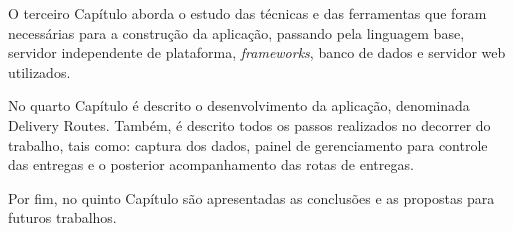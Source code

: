 O terceiro Capítulo aborda o estudo das técnicas e das ferramentas que foram necessárias para a construção da aplicação, passando pela linguagem base, servidor independente de plataforma, \textit{frameworks}, banco de dados e servidor web utilizados.

No quarto Capítulo é descrito o desenvolvimento da aplicação, denominada Delivery Routes. Também, é descrito todos os passos realizados no decorrer do trabalho, tais como: captura dos dados, painel de gerenciamento para controle das entregas e o posterior acompanhamento das rotas de entregas.

Por fim, no quinto Capítulo são apresentadas as conclusões e as propostas para futuros trabalhos.